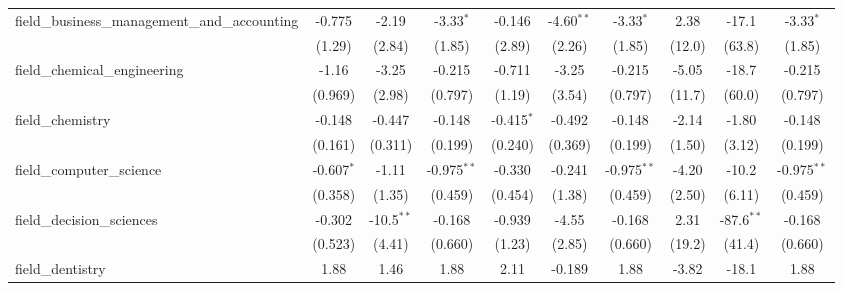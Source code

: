 \begin{tabular}{lccccccccc}
   field\_business\_management\_and\_accounting                & -0.775         & -2.19          & -3.33$^{*}$    & -0.146        & -4.60$^{**}$   & -3.33$^{*}$    & 2.38          & -17.1        & -3.33$^{*}$\\   
                                                               & (1.29)         & (2.84)         & (1.85)         & (2.89)        & (2.26)         & (1.85)         & (12.0)        & (63.8)       & (1.85)\\   
   field\_chemical\_engineering                                & -1.16          & -3.25          & -0.215         & -0.711        & -3.25          & -0.215         & -5.05         & -18.7        & -0.215\\   
                                                               & (0.969)        & (2.98)         & (0.797)        & (1.19)        & (3.54)         & (0.797)        & (11.7)        & (60.0)       & (0.797)\\   
   field\_chemistry                                            & -0.148         & -0.447         & -0.148         & -0.415$^{*}$  & -0.492         & -0.148         & -2.14         & -1.80        & -0.148\\   
                                                               & (0.161)        & (0.311)        & (0.199)        & (0.240)       & (0.369)        & (0.199)        & (1.50)        & (3.12)       & (0.199)\\   
   field\_computer\_science                                    & -0.607$^{*}$   & -1.11          & -0.975$^{**}$  & -0.330        & -0.241         & -0.975$^{**}$  & -4.20         & -10.2        & -0.975$^{**}$\\   
                                                               & (0.358)        & (1.35)         & (0.459)        & (0.454)       & (1.38)         & (0.459)        & (2.50)        & (6.11)       & (0.459)\\   
   field\_decision\_sciences                                   & -0.302         & -10.5$^{**}$   & -0.168         & -0.939        & -4.55          & -0.168         & 2.31          & -87.6$^{**}$ & -0.168\\   
                                                               & (0.523)        & (4.41)         & (0.660)        & (1.23)        & (2.85)         & (0.660)        & (19.2)        & (41.4)       & (0.660)\\   
   field\_dentistry                                            & 1.88           & 1.46           & 1.88           & 2.11          & -0.189         & 1.88           & -3.82         & -18.1        & 1.88\\   

\end{tabular}
